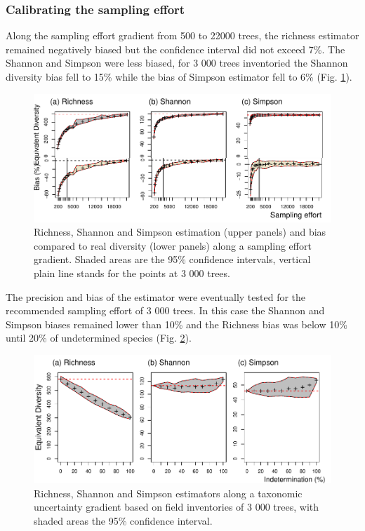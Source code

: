 \documentclass[
  11pt,
  french,
  A4paper,
  extrafontsizes,onecolumn,openright
  ]{memoir}
\begin{document}
\subsubsection{Calibrating the sampling
effort}\label{calibrating-the-sampling-effort}

Along the sampling effort gradient from 500 to 22000 trees, the richness
estimator remained negatively biased but the confidence interval did not
exceed 7\%. The Shannon and Simpson were less biased, for 3 000 trees
inventoried the Shannon diversity bias fell to 15\% while the bias of
Simpson estimator fell to 6\% (Fig. \ref{fig:SEgradient}).

\begin{figure}

{\centering \includegraphics[width=1\linewidth]{Manuscript_files/figure-latex/SEgradient-1} 

}

\caption{Richness, Shannon and Simpson estimation (upper panels) and bias compared to real diversity (lower panels) along a sampling effort gradient. Shaded areas are the 95\% confidence intervals, vertical plain line stands for the points at 3 000 trees.}\label{fig:SEgradient}
\end{figure}

The precision and bias of the estimator were eventually tested for the
recommended sampling effort of 3 000 trees. In this case the Shannon and
Simpson biases remained lower than 10\% and the Richness bias was below
10\% until 20\% of undetermined species (Fig. \ref{fig:UncertGradLim}).

\begin{figure}

{\centering \includegraphics[width=1\linewidth]{Manuscript_files/figure-latex/UncertGradLim-1} 

}

\caption{Richness, Shannon and Simpson estimators along a taxonomic uncertainty gradient based on field inventories of 3 000 trees,  with shaded areas the 95\% confidence interval.}\label{fig:UncertGradLim}
\end{figure}
\end{document}
